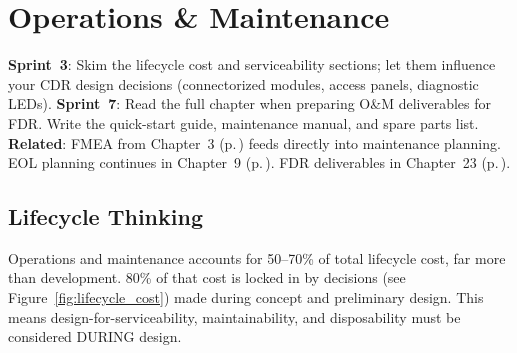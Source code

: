 \chapter{Operations \& Maintenance}\label{ch:oandm}

\begin{tipbox}
\textbf{Sprint~3}: Skim the lifecycle cost and serviceability sections; let them influence your CDR design decisions (connectorized modules, access panels, diagnostic LEDs). \textbf{Sprint~7}: Read the full chapter when preparing O\&M deliverables for FDR. Write the quick-start guide, maintenance manual, and spare parts list. \textbf{Related}: FMEA from Chapter~3 (p.\,\pageref{ch:requirements}) feeds directly into maintenance planning. EOL planning continues in Chapter~9 (p.\,\pageref{ch:eol}). FDR deliverables in Chapter~23 (p.\,\pageref{ch:fdr}).
\end{tipbox}

\vspace{1em}









\section{Lifecycle Thinking}
Operations and maintenance accounts for 50--70\% of total lifecycle cost, far more than development. 80\% of that cost is locked in by decisions (see Figure~\ref{fig:lifecycle_cost}) made during concept and preliminary design. This means design-for-serviceability, maintainability, and disposability must be considered DURING design.

